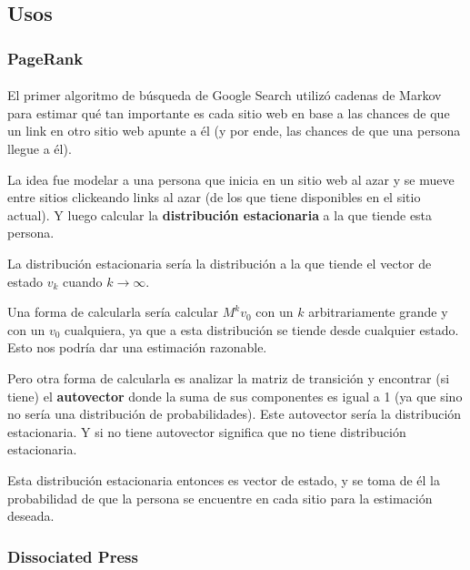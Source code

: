 \documentclass[../main.tex]{subfiles}
\begin{document}
\subsection{Usos}
\subsubsection{PageRank}
\paragraph{} El primer algoritmo de búsqueda de Google Search utilizó cadenas de Markov para estimar qué tan importante es cada sitio web en base a las chances de que un link en otro sitio web apunte a él (y por ende, las chances de que una persona llegue a él).

La idea fue modelar a una persona que inicia en un sitio web al azar y se mueve entre sitios clickeando links al azar (de los que tiene disponibles en el sitio actual). Y luego calcular la \textbf{distribución estacionaria} a la que tiende esta persona.

La distribución estacionaria sería la distribución a la que tiende el vector de estado \(v_{k}\) cuando \(k \rightarrow \infty\).

Una forma de calcularla sería calcular \(M^{k}v_{0}\) con un \(k\) arbitrariamente grande y con un \(v_{0}\) cualquiera, ya que a esta distribución se tiende desde cualquier estado. Esto nos podría dar una estimación razonable.

Pero otra forma de calcularla es analizar la matriz de transición y encontrar (si tiene) el \textbf{autovector} donde la suma de sus componentes es igual a 1 (ya que sino no sería una distribución de probabilidades). Este autovector sería la distribución estacionaria. Y si no tiene autovector significa que no tiene distribución estacionaria.

Esta distribución estacionaria entonces es vector de estado, y se toma de él la probabilidad de que la persona se encuentre en cada sitio para la estimación deseada.

\subsubsection{Dissociated Press}
\end{document}
